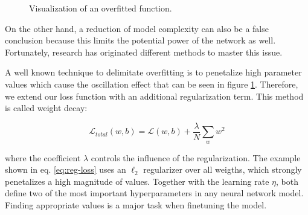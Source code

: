 \begin{figure}[htpb]
  \centering
  \caption[Regularization and overfitting]{Visualization of an overfitted function.}\label{fig:overfitting}
\end{figure}

On the other hand, a reduction of model complexity can also be a false conclusion because this limits the potential power of the network as well. Fortunately, research has originated different methods to master this issue.

A well known technique to delimitate overfitting is to penetalize high parameter values which cause the oscillation effect that can be seen in figure \ref{fig:overfitting}. Therefore, we extend our loss function with an additional regularization term. This method is called weight decay:

\begin{equation} \label{eq:reg-loss}
  \mathcal{L}_{total}(w, b)= \mathcal{L}(w, b) + \frac{\lambda}{N} \sum\limits_{w}w^2
\end{equation}

where the coefficient $ \lambda $ controls the influence of the regularization. The example shown in eq. \ref{eq:reg-loss} uses an $ \ell_{2} $ regularizer over all weigths, which strongly penetalizes a high magnitude of values. Together with the learning rate $ \eta $, both define two of the most important hyperparameters in any neural network model. Finding appropriate values is a major task when finetuning the model.

